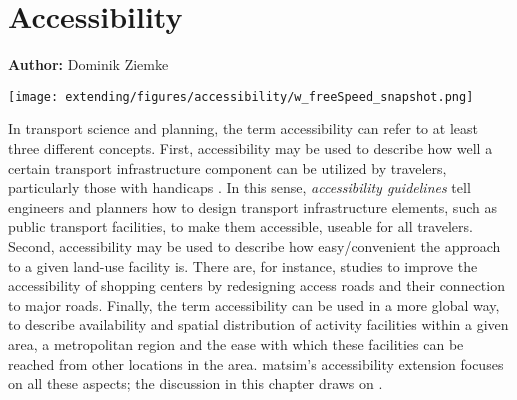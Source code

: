 \chapter{Accessibility}
\label{ch:accessibility}

\hfill \textbf{Author:} Dominik Ziemke

\begin{center} \texttt{[image: extending/figures/accessibility/w\_freeSpeed\_snapshot.png]} \end{center}




In transport science and planning, the term accessibility can refer to at least three different concepts. 
First, accessibility may be used to describe how well a certain transport infrastructure component 
can be utilized by travelers, particularly those with handicaps \citep{Faura2012AccessibilityEvaluationTrafficSimulation}. 
In this sense, \emph{accessibility guidelines} tell engineers and planners how to design transport 
infrastructure elements, such as public transport facilities, to make them accessible, \ie useable 
for all travelers. Second, accessibility may be used to describe how easy/convenient the approach 
to a given land-use facility is. There are, for instance, studies \citep{Fujiyama2004AccessibleDesignPTFacilities} 
to improve the accessibility of shopping centers by redesigning access roads and their 
connection to major roads. Finally, the term accessibility can be used in a more global way, to 
describe availability and spatial distribution of activity facilities within a given area, \eg a 
metropolitan region and the ease with which these facilities can be reached from other locations in
the area. \gls{matsim}'s accessibility extension focuses on all these aspects; 
the discussion in this chapter draws on \citet{NicolaiNagelHiResAccessibilityMethod}.

